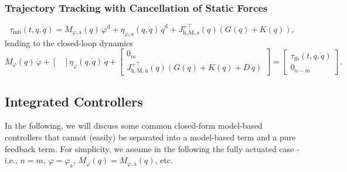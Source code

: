 \subsubsection{Trajectory Tracking with Cancellation of Static Forces}
\begin{equation}
    \tau_\mathrm{mb}(t, q, \dot{q}) = M_{\varphi,\mathrm{a}}(q) \, \ddot{\varphi}^\mathrm{d} + \eta_{\varphi,\mathrm{a}}(q,\dot{q}) \, \dot{q}^\mathrm{d} + J_{\mathrm{h},\mathrm{M},\mathrm{a}}^{+\top}(q) \left ( G(q) + K(q) \right ),
\end{equation}
leading to the closed-loop dynamics
\begin{equation}
    M_\varphi(q) \, \ddot{\varphi} + \begin{bmatrix}
        
    \end{bmatrix} \eta_\varphi(q,\dot{q}) \, \dot{q} + \begin{bmatrix}
        0_m\\ J_{\mathrm{h},\mathrm{M},\mathrm{u}}^{+\top}(q) \left ( G(q) + K(q) + D \, \dot{q} \right )
    \end{bmatrix} = \begin{bmatrix}
        \tau_\mathrm{fb}(t, q, \dot{q})\\ 0_{n-m}
    \end{bmatrix}.
\end{equation}

\subsection{Integrated Controllers}\label{sub:background:model_based_control:integrated_controllers}
In the following, we will discuss some common closed-form model-based controllers that cannot (easily) be separated into a model-based term and a pure feedback term.
For simplicity, we assume in the following the fully actuated case - i.e., $n=m$, $\varphi = \varphi_\mathrm{a}$, $M_{\varphi}(q) = M_{\varphi,\mathrm{a}}(q)$, etc.

